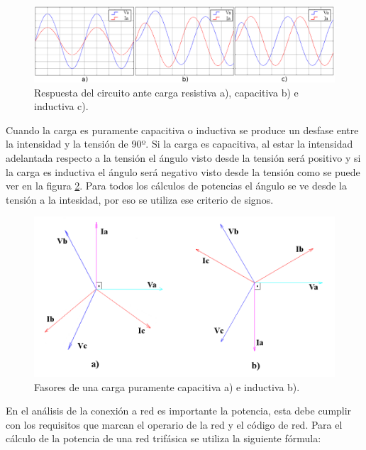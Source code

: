 \documentclass{book}
\begin{document}
\begin{figure}[h!]
\centering
\includegraphics[width=1\textwidth]{Va_IaALL.PNG}
\caption{Respuesta del circuito ante carga resistiva a), capacitiva b) e inductiva c).}
\label{Va_IaALL}
\end{figure}

Cuando la carga es puramente capacitiva o inductiva se produce un desfase entre la intensidad y la tensi\'on de 90º. Si la carga es capacitiva, al estar la intensidad adelantada respecto a la tensi\'on el \'angulo visto desde la tensi\'on ser\'a positivo y si la carga es inductiva el \'angulo ser\'a negativo visto desde la tensi\'on como se puede ver en la figura \ref {PhasComp}. Para todos los c\'alculos de potencias el \'angulo se ve desde la tensi\'on a la intesidad, por eso se utiliza ese criterio de signos. \par

\begin{figure}[h!]
\centering
\includegraphics[width=1\textwidth]{PhasComp.PNG}
\caption{Fasores de una carga puramente capacitiva a) e inductiva b).}
\label{PhasComp}
\end{figure}

En el an\'alisis de la conexi\'on a red es importante la potencia, esta debe cumplir con los requisitos que marcan el operario de la red y el c\'odigo de red. Para el c\'alculo de la potencia de una red trif\'asica se utiliza la siguiente f\'ormula:   \par
\end{document}

